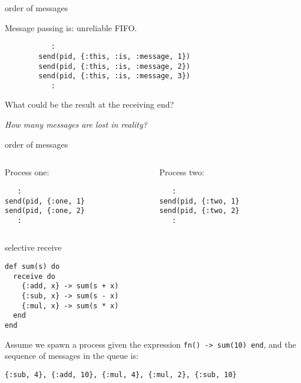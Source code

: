 \begin{frame}[fragile]{order of messages}

Message passing is: unreliable FIFO.

\pause\vspace{10pt}
\begin{verbatim}
           :
        send(pid, {:this, :is, :message, 1})
        send(pid, {:this, :is, :message, 2})
        send(pid, {:this, :is, :message, 3})
           :
\end{verbatim}

\pause What could be the result at the receiving end?

\pause\vspace{10pt}
{\em How many messages are lost in reality?} 

\end{frame}

\begin{frame}[fragile]{order of messages}

  \begin{columns}
    \begin{column}{0.5\textwidth}
Process one:
\begin{verbatim}
   :
send(pid, {:one, 1}
send(pid, {:one, 2}
   :
\end{verbatim}
    \end{column}
    \begin{column}{0.5\textwidth}
Process two:
\begin{verbatim}
   :
send(pid, {:two, 1}
send(pid, {:two, 2}
   :
\end{verbatim}
    \end{column}
    
  \end{columns}
  
\end{frame}

\begin{frame}[fragile]{selective receive}

\begin{verbatim}
def sum(s) do
  receive do
    {:add, x} -> sum(s + x)
    {:sub, x} -> sum(s - x)
    {:mul, x} -> sum(s * x)
  end
end
\end{verbatim}

\pause\vspace{10pt}

Assume we spawn a process given the expression {\tt fn() -> sum(10) end}, \pause and the sequence of messages in the queue is:

\vspace{10pt}
{\tt \{:sub, 4\}, \{:add, 10\}, \{:mul, 4\}, \{:mul, 2\}, \{:sub, 10\}}

\end{frame}



